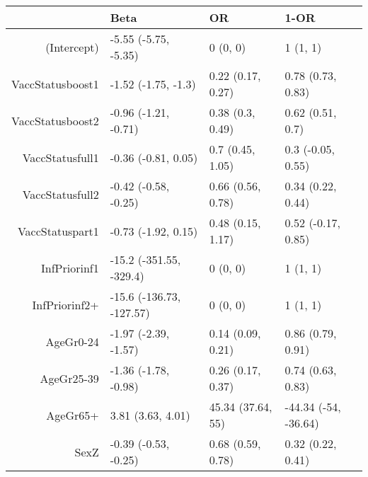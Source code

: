 \begin{table}[ht]
\centering
\begin{tabular}{rlll}
  \hline
 & Beta & OR & 1-OR \\ 
  \hline
(Intercept) & -5.55 (-5.75, -5.35) & 0 (0, 0) & 1 (1, 1) \\ 
  VaccStatusboost1 & -1.52 (-1.75, -1.3) & 0.22 (0.17, 0.27) & 0.78 (0.73, 0.83) \\ 
  VaccStatusboost2 & -0.96 (-1.21, -0.71) & 0.38 (0.3, 0.49) & 0.62 (0.51, 0.7) \\ 
  VaccStatusfull1 & -0.36 (-0.81, 0.05) & 0.7 (0.45, 1.05) & 0.3 (-0.05, 0.55) \\ 
  VaccStatusfull2 & -0.42 (-0.58, -0.25) & 0.66 (0.56, 0.78) & 0.34 (0.22, 0.44) \\ 
  VaccStatuspart1 & -0.73 (-1.92, 0.15) & 0.48 (0.15, 1.17) & 0.52 (-0.17, 0.85) \\ 
  InfPriorinf1 & -15.2 (-351.55, -329.4) & 0 (0, 0) & 1 (1, 1) \\ 
  InfPriorinf2+ & -15.6 (-136.73, -127.57) & 0 (0, 0) & 1 (1, 1) \\ 
  AgeGr0-24 & -1.97 (-2.39, -1.57) & 0.14 (0.09, 0.21) & 0.86 (0.79, 0.91) \\ 
  AgeGr25-39 & -1.36 (-1.78, -0.98) & 0.26 (0.17, 0.37) & 0.74 (0.63, 0.83) \\ 
  AgeGr65+ & 3.81 (3.63, 4.01) & 45.34 (37.64, 55) & -44.34 (-54, -36.64) \\ 
  SexZ & -0.39 (-0.53, -0.25) & 0.68 (0.59, 0.78) & 0.32 (0.22, 0.41) \\ 
   \hline
\end{tabular}
\end{table}
